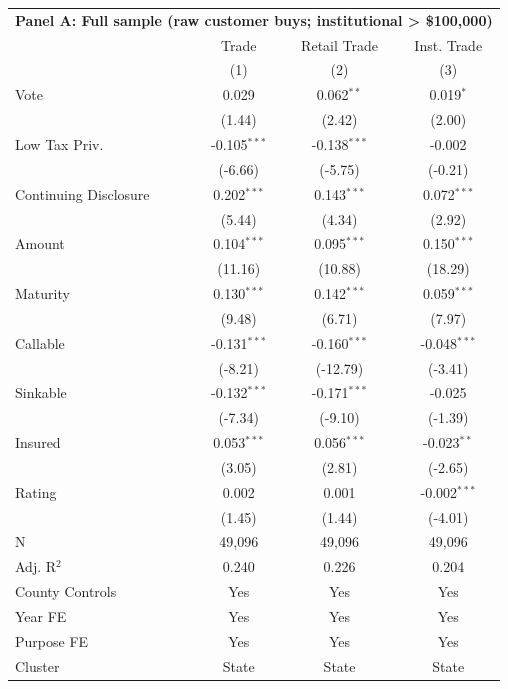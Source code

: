 \begingroup
\centering
\begin{tabular*}{\textwidth}{@{\extracolsep{\fill}}lccc}
\multicolumn{5}{l}{\textbf{Panel A: Full sample (raw customer buys; institutional > \$100,000)}}\\

\addlinespace
   \toprule
                         & Trade          & Retail Trade   & Inst. Trade\\  
                         & (1)            & (2)            & (3)\\  
   \midrule 
   Vote                  & 0.029          & 0.062$^{**}$   & 0.019$^{*}$\\   
                         & (1.44)        & (2.42)        & (2.00)\\   
   Low Tax Priv.         & -0.105$^{***}$ & -0.138$^{***}$ & -0.002\\   
                         & (-6.66)       & (-5.75)       & (-0.21)\\   
   Continuing Disclosure & 0.202$^{***}$  & 0.143$^{***}$  & 0.072$^{***}$\\   
                         & (5.44)        & (4.34)        & (2.92)\\   
   Amount                & 0.104$^{***}$  & 0.095$^{***}$  & 0.150$^{***}$\\   
                         & (11.16)       & (10.88)       & (18.29)\\   
   Maturity              & 0.130$^{***}$  & 0.142$^{***}$  & 0.059$^{***}$\\   
                         & (9.48)        & (6.71)        & (7.97)\\   
   Callable              & -0.131$^{***}$ & -0.160$^{***}$ & -0.048$^{***}$\\   
                         & (-8.21)       & (-12.79)      & (-3.41)\\   
   Sinkable              & -0.132$^{***}$ & -0.171$^{***}$ & -0.025\\   
                         & (-7.34)       & (-9.10)       & (-1.39)\\   
   Insured               & 0.053$^{***}$  & 0.056$^{***}$  & -0.023$^{**}$\\   
                         & (3.05)        & (2.81)        & (-2.65)\\   
   Rating                & 0.002          & 0.001          & -0.002$^{***}$\\   
                         & (1.45)        & (1.44)        & (-4.01)\\   
   \hline
   N          & 49,096         & 49,096         & 49,096\\  
   Adj. R$^2$        & 0.240          & 0.226          & 0.204\\  
   County Controls       & Yes            & Yes            & Yes\\  
   Year FE               & Yes            & Yes            & Yes\\  
   Purpose FE            & Yes            & Yes            & Yes\\  
   Cluster              & State & State & State\\  
   \bottomrule
\end{tabular*}
\par\endgroup
